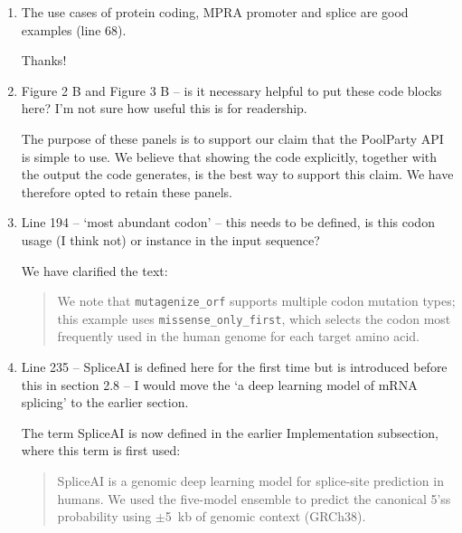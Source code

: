 \documentclass[11pt]{article}
\newenvironment{response}{\par\color{responseblue}}{\par}
\newenvironment{msquote}
  {\begin{quote}\color{quotedtext}\noindent\ignorespaces}
  {\end{quote}}
\begin{document}
\begin{enumerate}
\item The use cases of protein coding, MPRA promoter and splice are good examples
(line 68).

\begin{response}
Thanks!
\end{response}

\item Figure 2 B and Figure 3 B -- is it necessary helpful to put these code
blocks here? I'm not sure how useful this is for readership.

\begin{response}
The purpose of these panels is to support our claim that the PoolParty API is simple to use. We believe that showing the code explicitly, together with the output the code generates, is the best way to support this claim. We have therefore opted to retain these panels. 
\end{response}

\item Line 194 -- `most abundant codon' -- this needs to be defined, is this
codon usage (I think not) or instance in the input sequence?

\begin{response}
We have clarified the text:

\begin{msquote}
We note that \texttt{mutagenize\_orf} supports multiple codon mutation types; this example uses \texttt{missense\_only\_first}, which selects the codon most frequently used in the human genome for each target amino acid.
\end{msquote}
\end{response}

\item Line 235 -- SpliceAI is defined here for the first time but is introduced
before this in section 2.8 -- I would move the `a deep learning model of mRNA
splicing' to the earlier section.

\begin{response}
The term SpliceAI is now defined in the earlier Implementation subsection, where this term is first used:

\begin{msquote}
SpliceAI \citep{Jaganathan2019ps} is a genomic deep learning model for splice-site prediction in humans. We used the five-model ensemble to predict the canonical 5'ss probability using $\pm$5~kb of genomic context (GRCh38).
\end{msquote}
\end{response}


\end{enumerate}
\end{document}

